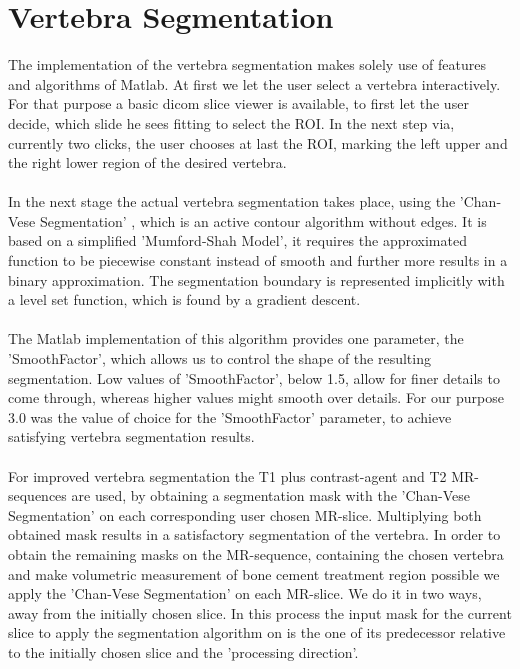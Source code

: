 \documentclass{article}
\begin{document}
  \section{Vertebra Segmentation}
  {
  	The implementation of the vertebra segmentation makes solely use of features and algorithms
  	of Matlab. At first we let the user select a vertebra interactively. For that purpose a basic 
  	dicom slice viewer is available, to first let the user decide, which slide he sees fitting to select the ROI. In the next step via, currently two clicks, the user chooses at last the ROI, marking the left upper and the right lower region of the desired vertebra.\\
  	\\In the next stage the actual vertebra segmentation takes place, using the 'Chan-Vese Segmentation' \cite{[ChanVese01]}, which is an active contour algorithm without edges. It is based on a simplified 'Mumford-Shah Model', it requires the approximated function to be piecewise constant instead of smooth and further more results in a binary approximation. The segmentation boundary is represented implicitly with a level set function, which is found by a gradient descent. \\
  	\\ The Matlab implementation of this algorithm provides one parameter, the 'SmoothFactor', which allows us to control the shape of the resulting segmentation.
  	Low values of 'SmoothFactor', below 1.5, allow for finer details to come through, whereas higher values might smooth over details. For our purpose 3.0 was the value of choice for the 'SmoothFactor' parameter, to achieve satisfying vertebra segmentation results.\\
  	\\For improved vertebra segmentation the T1 plus contrast-agent and T2 MR-sequences are used, by obtaining a segmentation mask with the 'Chan-Vese Segmentation' \cite{[ChanVese01]} on each corresponding user chosen MR-slice. Multiplying both obtained mask results in a satisfactory segmentation of the vertebra.  
  	In order to obtain the remaining masks on the MR-sequence, containing the chosen vertebra and make volumetric measurement of bone cement treatment region possible we apply the 'Chan-Vese Segmentation' \cite{[ChanVese01]} on each MR-slice. \newline 
    We do it in two ways, away from the initially chosen slice. In this process the input mask for the current slice to apply the segmentation algorithm on is the one of its predecessor relative to the initially chosen slice and the 'processing direction'.
}
\end{document}
